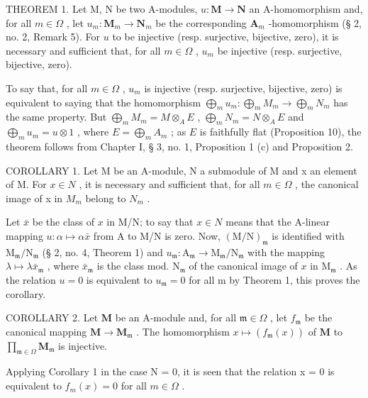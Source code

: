 THEOREM 1. Let M, N be two A-modules, \(u: \mathbf{M} \to \mathbf{N}\) an A-homomorphism and, for all \(m \in \Omega\) , let \(u_m: \mathbf{M}_m \to \mathbf{N}_m\) be the corresponding \(\mathbf{A}_m\) -homomorphism (§ 2, no. 2, Remark 5). For \(u\) to be injective (resp. surjective, bijective, zero), it is necessary and sufficient that, for all \(m \in \Omega\) , \(u_m\) be injective (resp. surjective, bijective, zero).

To say that, for all \(m \in \Omega\) , \(u_m\) is injective (resp. surjective, bijective, zero) is equivalent to saying that the homomorphism \(\bigoplus_{m} u_m: \bigoplus_{m} M_m \to \bigoplus_{m} N_m\) has the same property. But \(\bigoplus_{m} M_m = M \otimes_A E\) , \(\bigoplus_{m} N_m = N \otimes_A E\) and \(\bigoplus_{m} u_m = u \otimes 1\) , where \(E = \bigoplus_{m} A_m\) ; as \(E\) is faithfully flat (Proposition 10), the theorem follows from Chapter I, § 3, no. 1, Proposition 1 (c) and Proposition 2.

COROLLARY 1. Let M be an A-module, N a submodule of M and x an element of M. For \(x \in N\) , it is necessary and sufficient that, for all \(m \in \Omega\) , the canonical image of x in \(M_{m}\) belong to \(N_{m}\) .

Let \(\bar{x}\) be the class of \(x\) in M/N; to say that \(x \in N\) means that the A-linear mapping \(u: \alpha \mapsto \alpha \bar{x}\) from A to M/N is zero. Now, \((\mathrm{M} / \mathrm{N})_{\mathfrak{m}}\) is identified with \(\mathrm{M}_{\mathfrak{m}} / \mathrm{N}_{\mathfrak{m}}\) (§ 2, no. 4, Theorem 1) and \(u_{\mathfrak{m}}: \mathrm{A}_{\mathfrak{m}} \to \mathrm{M}_{\mathfrak{m}} / \mathrm{N}_{\mathfrak{m}}\) with the mapping \(\lambda \mapsto \lambda \bar{x}_{\mathfrak{m}}\) , where \(\bar{x}_{\mathfrak{m}}\) is the class mod. \(\mathrm{N}_{\mathfrak{m}}\) of the canonical image of \(x\) in \(\mathrm{M}_{\mathfrak{m}}\) . As the relation \(u = 0\) is equivalent to \(u_{\mathfrak{m}} = 0\) for all m by Theorem 1, this proves the corollary.

COROLLARY 2. Let \(\mathbf{M}\) be an A-module and, for all \(\mathfrak{m} \in \Omega\) , let \(f_{\mathfrak{m}}\) be the canonical mapping \(\mathbf{M} \to \mathbf{M}_{\mathfrak{m}}\) . The homomorphism \(x \mapsto (f_{\mathfrak{m}}(x))\) of \(\mathbf{M}\) to \(\prod_{\mathfrak{m} \in \Omega} \mathbf{M}_{\mathfrak{m}}\) is injective.

Applying Corollary 1 in the case N = 0, it is seen that the relation x = 0 is equivalent to \(f_{m}(x) = 0\) for all \(m \in \Omega\) .

